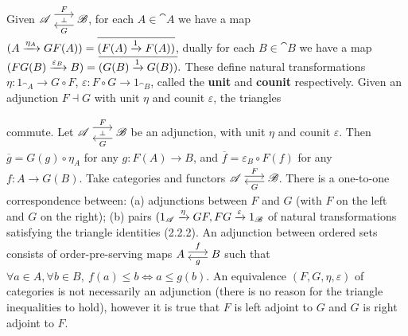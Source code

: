  Given $\cat A \ladj{F}{G} \cat B$, for each $A \in \cat A$ we have a map $(A \xrightarrow[]{\eta_A} GF(A)) = \overline{(F(A) \xrightarrow[]{1} F(A))}$, dually for each $B \in \cat B$ we have a map $(FG(B) \xrightarrow[]{\varepsilon_B} B) = \overline{(G(B) \xrightarrow[]{1} G(B))}.$ These define natural transformations $\eta : 1_{\cat A} \to G \circ F$, $\varepsilon : F \circ G \to 1_{\cat B}$, called the \textbf{unit} and \textbf{counit} respectively.
 Given an adjunction $F \dashv G$ with unit $\eta$ and counit $\varepsilon$, the triangles 
commute.
 Let $\cat A \ladj{F}{G} \cat B$ be an adjunction, with unit $\eta$ and counit $\varepsilon$. Then $\overline{g} = G(g) \circ \eta_A$ for any $g: F(A) \to B$, and $\overline{f} = \varepsilon_B \circ F(f)$ for any $f : A \to G(B)$.
 Take categories and functors $\cat A \isofuncs{F}{G} \cat B$. There is a one-to-one correspondence between: (a) adjunctions between $F$ and $G$ (with $F$ on the left and $G$ on the right); (b) pairs $(1_{\mathscr{A}} \xrightarrow[]{\eta} GF, FG \xrightarrow[]{\varepsilon} 1_{\mathscr{B}}$ of natural transformations satisfying the triangle identities (2.2.2).
 An adjunction between ordered sets consists of order-pre-serving maps $A \isofuncs{f}{g} B$ such that $\forall a \in A, \forall b \in B, \ f(a) \le b \iff a \le g(b)$.
 An equivalence $(F, G, \eta, \varepsilon)$ of categories is not necessarily an adjunction (there is no reason for the triangle inequalities to hold), however it is true that $F$ is left adjoint to $G$ and $G$ is right adjoint to $F$.